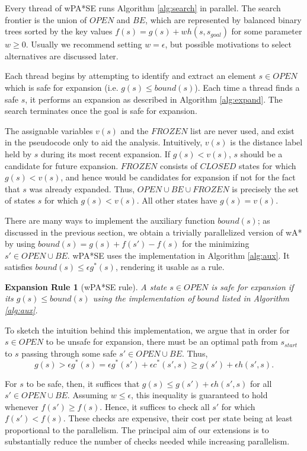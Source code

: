 \documentclass[letterpaper]{article}
\newtheorem{rul}{Expansion Rule}
\begin{document}
Every thread of wPA*SE runs Algorithm \ref{alg:search} in parallel. The search frontier is the union of $OPEN$ and $BE$, which are represented by balanced binary trees sorted by the key values $f(s) = g(s) + wh(s,s_{goal})$ for some parameter $w\ge 0$. Usually we recommend setting $w=\epsilon$, but possible motivations to select alternatives are discussed later.

Each thread begins by attempting to identify and extract an element $s\in OPEN$ which is safe for expansion (i.e. $g(s)\le bound(s)$). Each time a thread finds a safe $s$, it performs an expansion as described in Algorithm \ref{alg:expand}. The search terminates once the goal is safe for expansion.

The assignable variables $v(s)$ and the $FROZEN$ list are never used, and exist in the pseudocode only to aid the analysis. Intuitively, $v(s)$ is the distance label held by $s$ during its most recent expansion. If $g(s) < v(s)$, $s$ should be a candidate for future expansion. $FROZEN$ consists of $CLOSED$ states for which $g(s) < v(s)$, and hence would be candidates for expansion if not for the fact that $s$ was already expanded. Thus, $OPEN\cup BE\cup FROZEN$ is precisely the set of states $s$ for which $g(s) < v(s)$. All other states have $g(s) = v(s)$.

There are many ways to implement the auxiliary function $bound(s)$; as discussed in the previous section, we obtain a trivially parallelized version of wA* by using $bound(s) = g(s) + f(s') - f(s)$ for the minimizing $s'\in OPEN \cup BE$. wPA*SE uses the implementation in Algorithm \ref{alg:aux}. It satisfies $bound(s) \le \epsilon g^*(s)$, rendering it usable as a rule.

\begin{rul}[wPA*SE rule]
A state $s\in OPEN$ is safe for expansion if its $g(s) \le bound(s)$ using the implementation of $bound$ listed in Algorithm \ref{alg:aux}.
\end{rul}

To sketch the intuition behind this implementation, we argue that in order for $s\in OPEN$ to be unsafe for expansion, there must be an optimal path from $s_{start}$ to $s$ passing through some safe $s'\in OPEN\cup BE$. Thus,
\[g(s) > \epsilon g^*(s) = \epsilon g^*(s') + \epsilon c^*(s',s) \ge g(s') + \epsilon h(s',s).\]

For $s$ to be safe, then, it suffices that $g(s) \le g(s') + \epsilon h(s', s)$ for all $s'\in OPEN\cup BE$. Assuming $w \le \epsilon$, this inequality is guaranteed to hold whenever $f(s') \ge f(s)$. Hence, it suffices to check all $s'$ for which $f(s') < f(s)$. These checks are expensive, their cost per state being at least proportional to the parallelism. The principal aim of our extensions is to substantially reduce the number of checks needed while increasing parallelism.
\end{document}
